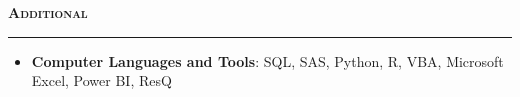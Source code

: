 \documentclass[11pt,letterpaper]{article}
\newcommand{\sectline}{\vspace{5pt}\hrule height 1.5pt\vspace{5pt}}
\newcommand{\heading}[1]{{\fontsize{12pt}{13pt} {\textbf{\textsc{#1}}}}}
\begin{document}
\heading{Additional}\sectline
\begin{itemize}
	\item \textbf{Computer Languages and Tools}: SQL, SAS, Python, R, VBA, Microsoft Excel, Power BI, ResQ
\end{itemize}
\end{document}
